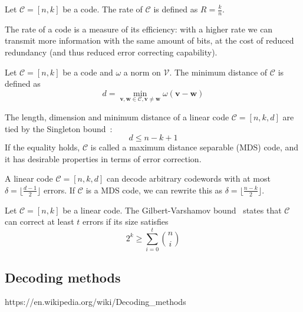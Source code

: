 \begin{definition}[Rate]
    Let $\mathcal{C} = [n,k]$ be a code. The rate of $\mathcal{C}$ is defined as $R = \frac{k}{n}$.
\end{definition}
The rate of a code is a measure of its efficiency: with a higher rate we can transmit more information with the same amount
of bits, at the cost of reduced redundancy (and thus reduced error correcting capability).

\begin{definition}
    Let $\mathcal{C} = [n,k]$ be a code and $\omega$ a norm on $\mathcal{V}$. The minimum distance of $\mathcal{C}$ is defined as
    \begin{equation*}
        d = \min_{\mathbf{v}, \mathbf{w} \in \mathcal{C}, \mathbf{v}\neq \mathbf{w}} \omega(\mathbf{v} - \mathbf{w})
    \end{equation*}
\end{definition}
The length, dimension and minimum distance of a linear code $\mathcal{C} = [n,k,d]$ are tied by the Singleton bound~\cite{singleton1964maximum}:
\begin{equation*}
    d \leq n-k+1
\end{equation*}
If the equality holds, $\mathcal{C}$ is called a maximum distance separable (MDS) code, and it has desirable properties in terms of error correction.

\begin{definition}
A linear code $\mathcal{C} = [n,k,d]$ can decode arbitrary codewords with at most $\delta = \lfloor \frac{d-1}{2}\rfloor$ errors.
If $\mathcal{C}$ is a MDS code, we can rewrite this as $\delta = \lfloor \frac{n-k}{2} \rfloor$.
\end{definition}

\begin{definition}
    Let $\mathcal{C} = [n,k]$ be a linear code. The Gilbert-Varshamov bound~\cite{gilbert1952comparison,varshamov1957estimate} 
    states that $\mathcal{C}$ can correct at least $t$ errors if its size satisfies
    \begin{equation}
        2^k \geq \sum_{i=0}^t \binom{n}{i} \label{eq:gv_bound}
    \end{equation}
\end{definition}

\subsection{Decoding methods}
https://en.wikipedia.org/wiki/Decoding\_methods
